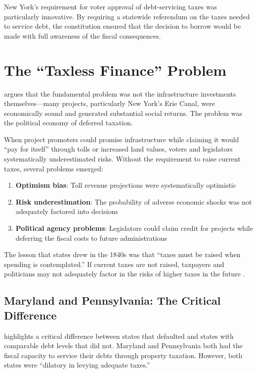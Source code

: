 \documentclass[12pt]{article}
\begin{document}
New York's requirement for voter approval of debt-servicing taxes was particularly innovative. By requiring a statewide referendum on the taxes needed to service debt, the constitution ensured that the decision to borrow would be made with full awareness of the fiscal consequences.

\section{The ``Taxless Finance'' Problem}

\citet{wallis2005constitutions} argues that the fundamental problem was not the infrastructure investments themselves---many projects, particularly New York's Erie Canal, were economically sound and generated substantial social returns. The problem was the political economy of deferred taxation.

When project promoters could promise infrastructure while claiming it would ``pay for itself'' through tolls or increased land values, voters and legislators systematically underestimated risks. Without the requirement to raise current taxes, several problems emerged:

\begin{enumerate}
\item \textbf{Optimism bias}: Toll revenue projections were systematically optimistic
\item \textbf{Risk underestimation}: The probability of adverse economic shocks was not adequately factored into decisions
\item \textbf{Political agency problems}: Legislators could claim credit for projects while deferring the fiscal costs to future administrations
\end{enumerate}

The lesson that states drew in the 1840s was that ``taxes must be raised when spending is contemplated.'' If current taxes are not raised, taxpayers and politicians may not adequately factor in the risks of higher taxes in the future \citep{grinath1997debt}.

\subsection{Maryland and Pennsylvania: The Critical Difference}

\citet{wallis2004sovereign} highlights a critical difference between states that defaulted and states with comparable debt levels that did not. Maryland and Pennsylvania both had the fiscal capacity to service their debts through property taxation. However, both states were ``dilatory in levying adequate taxes.''
\end{document}
